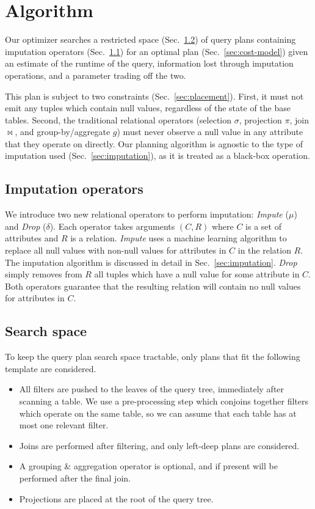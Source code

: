 \section{Algorithm}

Our optimizer searches a restricted space (Sec.~\ref{sec:search-space}) of query plans containing imputation operators (Sec.~\ref{sec:operators}) for an optimal plan (Sec.~\ref{sec:cost-model}) given an estimate of the runtime of the query, information lost through imputation operations, and a parameter trading off the two.

This plan is subject to two constraints (Sec.~\ref{sec:placement}).
First, it must not emit any tuples which contain null values, regardless of the state of the base tables.
Second, the traditional relational operators (selection $\sigma$, projection $\pi$, join $\bowtie$, and group-by/aggregate $g$) must never observe a null value in any attribute that they operate on directly.
Our planning algorithm is agnostic to the type of imputation used (Sec.~\ref{sec:imputation}), as it is treated as a black-box operation.

\subsection{Imputation operators}
\label{sec:operators}
We introduce two new relational operators to perform imputation: \textit{Impute} ($\mu$) and
\textit{Drop} ($\delta$). Each operator takes arguments $(C, R)$ where $C$ is a set of
attributes and $R$ is a relation. \textit{Impute} uses a machine learning algorithm to
replace all null values with non-null values for attributes in $C$ in the relation $R$.
The imputation algorithm is discussed in detail in Sec.~\ref{sec:imputation}.
\textit{Drop} simply removes from $R$ all tuples which have a null value for some attribute in $C$.
Both operators guarantee that the resulting relation will contain no null values for
attributes in $C$.  

\subsection{Search space}
\label{sec:search-space}
To keep the query plan search space tractable, only plans that fit the following template are considered.

\begin{itemize}
\item All filters are pushed to the leaves of the query tree, immediately after scanning a table. We use a pre-processing step which conjoins together filters which operate on the same table, so we can assume that each table has at most one relevant filter.

\item Joins are performed after filtering, and only left-deep plans are considered.

\item A grouping \& aggregation operator is optional, and if present will be performed after the final join.

\item Projections are placed at the root of the query tree.
\end{itemize}
  
